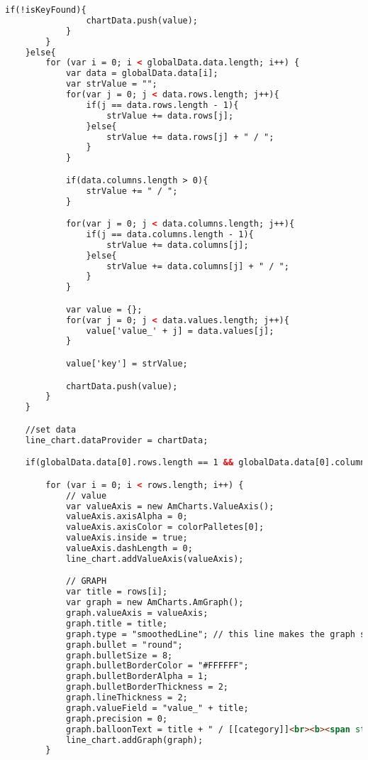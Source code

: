 \begin{lstlisting}[language=HTML,basicstyle=\tiny,caption=script.js]
            if(!isKeyFound){
                chartData.push(value);
            }
        }
    }else{
        for (var i = 0; i < globalData.data.length; i++) {
            var data = globalData.data[i];
            var strValue = "";
            for(var j = 0; j < data.rows.length; j++){
                if(j == data.rows.length - 1){
                    strValue += data.rows[j];
                }else{
                    strValue += data.rows[j] + " / ";
                }
            }

            if(data.columns.length > 0){
                strValue += " / ";
            }

            for(var j = 0; j < data.columns.length; j++){
                if(j == data.columns.length - 1){
                    strValue += data.columns[j];
                }else{
                    strValue += data.columns[j] + " / ";
                }
            }

            var value = {};
            for(var j = 0; j < data.values.length; j++){
                value['value_' + j] = data.values[j];
            }

            value['key'] = strValue;

            chartData.push(value);
        }
    }

    //set data
    line_chart.dataProvider = chartData;

    if(globalData.data[0].rows.length == 1 && globalData.data[0].columns.length == 1 && globalData.data[0].values.length == 1){

        for (var i = 0; i < rows.length; i++) {
            // value
            var valueAxis = new AmCharts.ValueAxis();
            valueAxis.axisAlpha = 0;
            valueAxis.axisColor = colorPalletes[0];
            valueAxis.inside = true;
            valueAxis.dashLength = 0;
            line_chart.addValueAxis(valueAxis);

            // GRAPH
            var title = rows[i];
            var graph = new AmCharts.AmGraph();
            graph.valueAxis = valueAxis;
            graph.title = title;
            graph.type = "smoothedLine"; // this line makes the graph smoothed line.
            graph.bullet = "round";
            graph.bulletSize = 8;
            graph.bulletBorderColor = "#FFFFFF";
            graph.bulletBorderAlpha = 1;
            graph.bulletBorderThickness = 2;
            graph.lineThickness = 2;
            graph.valueField = "value_" + title;
            graph.precision = 0;
            graph.balloonText = title + " / [[category]]<br><b><span style='font-size:14px;'>[[value]]</span></b>";
            line_chart.addGraph(graph);
        }


\end{lstlisting}
